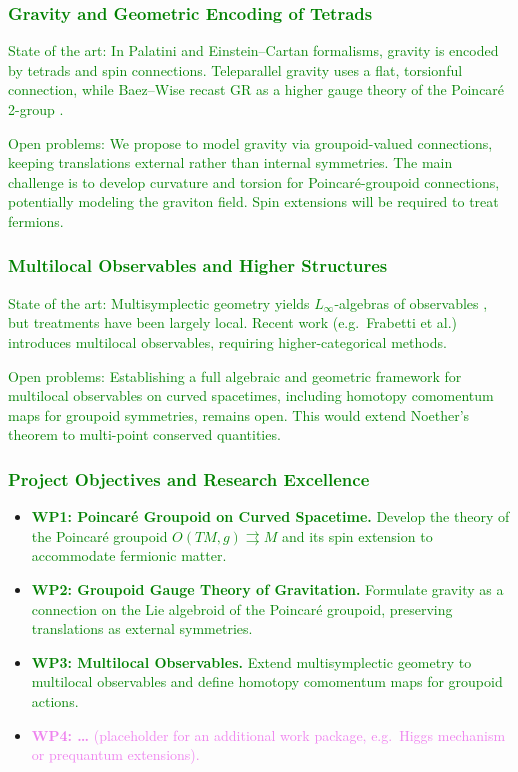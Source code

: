 \documentclass[11pt,draftproposal]{msca-pf}
\begin{document}
\subsubsection*{\textcolor{green}{Gravity and Geometric Encoding of Tetrads}}
\textcolor{green}{State of the art: In Palatini and Einstein--Cartan formalisms, gravity is encoded by tetrads and spin connections. Teleparallel gravity uses a flat, torsionful connection, while Baez--Wise recast GR as a higher gauge theory of the Poincaré 2-group \cite{BaezWise2005}.}

\textcolor{green}{Open problems: We propose to model gravity via groupoid-valued connections, keeping translations external rather than internal symmetries. The main challenge is to develop curvature and torsion for Poincaré-groupoid connections, potentially modeling the graviton field. Spin extensions will be required to treat fermions.}

\subsubsection*{\textcolor{green}{Multilocal Observables and Higher Structures}}
\textcolor{green}{State of the art: Multisymplectic geometry yields $L_\infty$-algebras of observables \cite{Rogers2010}, but treatments have been largely local. Recent work (e.g.\ Frabetti et al.) introduces multilocal observables, requiring higher-categorical methods.}

\textcolor{green}{Open problems: Establishing a full algebraic and geometric framework for multilocal observables on curved spacetimes, including homotopy comomentum maps for groupoid symmetries, remains open. This would extend Noether’s theorem to multi-point conserved quantities.}

\subsubsection*{\textcolor{green}{Project Objectives and Research Excellence}}
\begin{itemize}[noitemsep,topsep=0pt]
  \item \textcolor{green}{\textbf{WP1: Poincaré Groupoid on Curved Spacetime.} Develop the theory of the Poincaré groupoid $O(TM,g) \rightrightarrows M$ and its spin extension to accommodate fermionic matter.}
  \item \textcolor{green}{\textbf{WP2: Groupoid Gauge Theory of Gravitation.} Formulate gravity as a connection on the Lie algebroid of the Poincaré groupoid, preserving translations as external symmetries.}
  \item \textcolor{green}{\textbf{WP3: Multilocal Observables.} Extend multisymplectic geometry to multilocal observables and define homotopy comomentum maps for groupoid actions.}
  \item \textcolor{violet}{\textbf{WP4: \dots} (placeholder for an additional work package, e.g.\ Higgs mechanism or prequantum extensions).}
\end{itemize}
\end{document}
